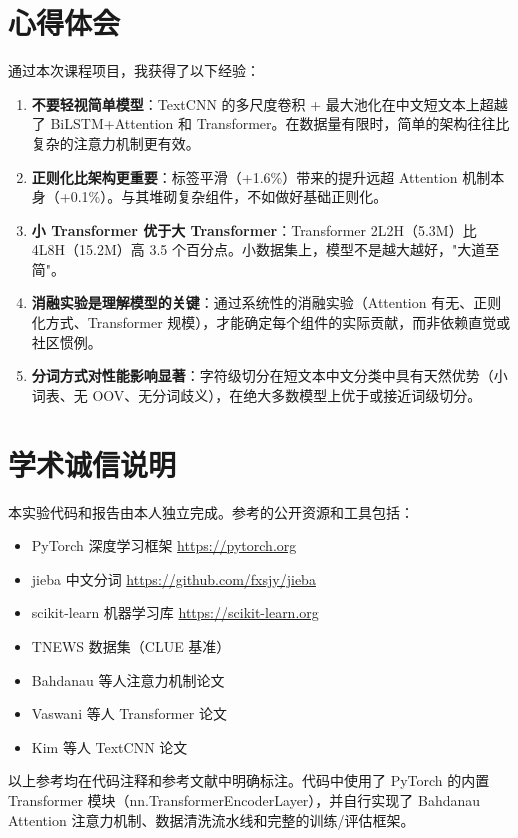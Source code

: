 \chapter{心得体会}

通过本次课程项目，我获得了以下经验：

\begin{enumerate}
\item \textbf{不要轻视简单模型}：TextCNN 的多尺度卷积 + 最大池化在中文短文本上超越了 BiLSTM+Attention 和 Transformer。在数据量有限时，简单的架构往往比复杂的注意力机制更有效。

\item \textbf{正则化比架构更重要}：标签平滑（+1.6\%）带来的提升远超 Attention 机制本身（+0.1\%）。与其堆砌复杂组件，不如做好基础正则化。

\item \textbf{小 Transformer 优于大 Transformer}：Transformer 2L2H（5.3M）比 4L8H（15.2M）高 3.5 个百分点。小数据集上，模型不是越大越好，"大道至简"。

\item \textbf{消融实验是理解模型的关键}：通过系统性的消融实验（Attention 有无、正则化方式、Transformer 规模），才能确定每个组件的实际贡献，而非依赖直觉或社区惯例。

\item \textbf{分词方式对性能影响显著}：字符级切分在短文本中文分类中具有天然优势（小词表、无 OOV、无分词歧义），在绝大多数模型上优于或接近词级切分。
\end{enumerate}

\chapter{学术诚信说明}

本实验代码和报告由本人独立完成。参考的公开资源和工具包括：

\begin{itemize}
\item PyTorch 深度学习框架 \url{https://pytorch.org}
\item jieba 中文分词 \url{https://github.com/fxsjy/jieba}
\item scikit-learn 机器学习库 \url{https://scikit-learn.org}
\item TNEWS 数据集（CLUE 基准）\cite{clue}
\item Bahdanau 等人注意力机制论文\cite{bahdanau2014}
\item Vaswani 等人 Transformer 论文\cite{vaswani2017}
\item Kim 等人 TextCNN 论文\cite{kim2014}
\end{itemize}

以上参考均在代码注释和参考文献中明确标注。代码中使用了 PyTorch 的内置 Transformer 模块（nn.TransformerEncoderLayer），并自行实现了 Bahdanau Attention 注意力机制、数据清洗流水线和完整的训练/评估框架。
